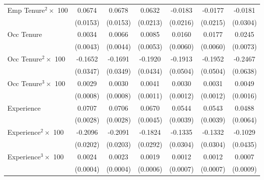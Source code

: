 {\begin{longtable}{l*{6}{c}}
Emp Tenure$^2\times$ 100&      0.0674\sym{***}&      0.0678\sym{***}&      0.0632\sym{***}&     -0.0183         &     -0.0177         &     -0.0181         \\
                    &    (0.0153)         &    (0.0153)         &    (0.0213)         &    (0.0216)         &    (0.0215)         &    (0.0304)         \\
Occ Tenure          &      0.0034         &      0.0066         &      0.0085         &      0.0160\sym{***}&      0.0177\sym{***}&      0.0245\sym{***}\\
                    &    (0.0043)         &    (0.0044)         &    (0.0053)         &    (0.0060)         &    (0.0060)         &    (0.0073)         \\
Occ Tenure$^2\times$ 100&     -0.1652\sym{***}&     -0.1691\sym{***}&     -0.1920\sym{***}&     -0.1913\sym{***}&     -0.1952\sym{***}&     -0.2467\sym{***}\\
                    &    (0.0347)         &    (0.0349)         &    (0.0434)         &    (0.0504)         &    (0.0504)         &    (0.0638)         \\
Occ Tenure$^3\times$ 100&      0.0029\sym{***}&      0.0030\sym{***}&      0.0041\sym{***}&      0.0030\sym{**} &      0.0031\sym{**} &      0.0049\sym{***}\\
                    &    (0.0008)         &    (0.0008)         &    (0.0011)         &    (0.0012)         &    (0.0012)         &    (0.0016)         \\
Experience          &      0.0707\sym{***}&      0.0706\sym{***}&      0.0670\sym{***}&      0.0544\sym{***}&      0.0543\sym{***}&      0.0488\sym{***}\\
                    &    (0.0028)         &    (0.0028)         &    (0.0045)         &    (0.0039)         &    (0.0039)         &    (0.0064)         \\
Experience$^2\times$ 100&     -0.2096\sym{***}&     -0.2091\sym{***}&     -0.1824\sym{***}&     -0.1335\sym{***}&     -0.1332\sym{***}&     -0.1029\sym{**} \\
                    &    (0.0202)         &    (0.0203)         &    (0.0292)         &    (0.0304)         &    (0.0304)         &    (0.0435)         \\
Experience$^3\times$ 100&      0.0024\sym{***}&      0.0023\sym{***}&      0.0019\sym{***}&      0.0012\sym{*}  &      0.0012\sym{*}  &      0.0007         \\
                    &    (0.0004)         &    (0.0004)         &    (0.0006)         &    (0.0007)         &    (0.0007)         &    (0.0009)         \\

\end{longtable}}

